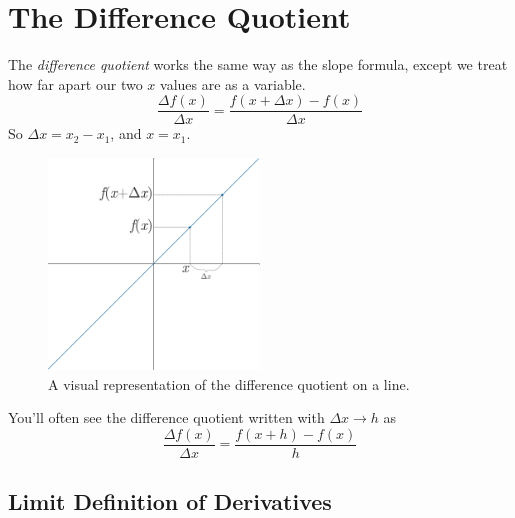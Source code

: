 
\section{The Difference Quotient}

The \emph{difference quotient} works the same way as the slope formula, except we treat how far apart our two $x$ values are as a variable.
\begin{equation}
  \frac{\Delta f(x)}{\Delta x}=\frac{f(x+\Delta x)-f(x)}{\Delta x}
\end{equation}
So $\Delta x=x_2-x_1$, and $x=x_1$.
\begin{figure}[H]
  \begin{center}
    \includegraphics[width=0.5\textwidth]{continuous/derivatives/diffquot.eps}
  \end{center}
  \caption{A visual representation of the difference quotient on a line.}
\end{figure}
You'll often see the difference quotient written with $\Delta x \to h$ as
\begin{equation}
  \frac{\Delta f(x)}{\Delta x}=\frac{f(x+h)-f(x)}{h}
\end{equation}

\subsection{Limit Definition of Derivatives}

